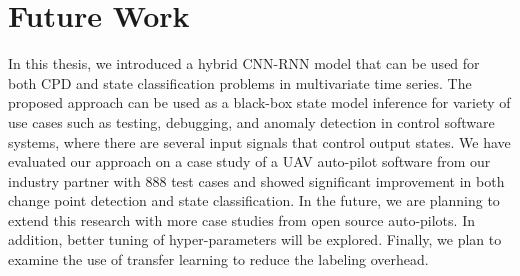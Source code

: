 


\chapter{Future Work} \label{sec:summary} %
In this thesis, we introduced a hybrid CNN-RNN model that can be used for both CPD and state classification problems in multivariate time series. The proposed approach can be used as a black-box state model inference for variety of use cases such as testing, debugging, and anomaly detection in control software systems, where there are several input signals that control output states. We have evaluated our approach on a case study of a UAV auto-pilot software from our industry partner with 888 test cases and showed significant improvement in both change point detection and state classification. In the future, we are planning to extend this research with more case studies from open source auto-pilots. In addition, better tuning of hyper-parameters will be explored. Finally, we plan to examine the use of transfer learning to reduce the labeling overhead.

